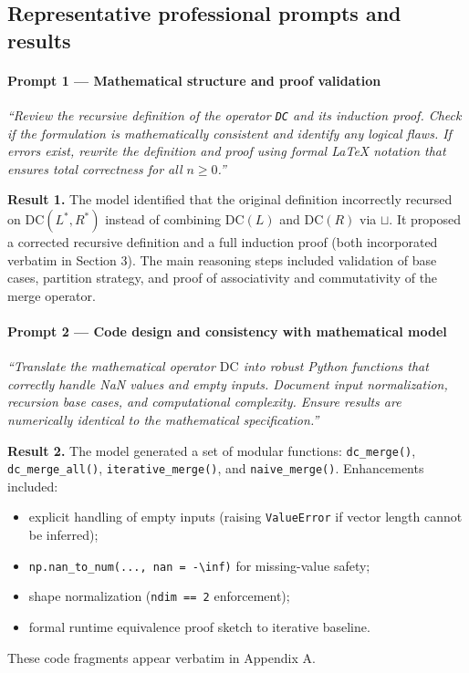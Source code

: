 \documentclass[11pt]{article}
\begin{document}
\subsection*{Representative professional prompts and results}

\paragraph{Prompt 1 — Mathematical structure and proof validation}
\textit{“Review the recursive definition of the operator \texttt{DC} and its induction proof.  
Check if the formulation is mathematically consistent and identify any logical flaws.  
If errors exist, rewrite the definition and proof using formal LaTeX notation that ensures total correctness for all $n\ge0$.”}

\textbf{Result 1.}  
The model identified that the original definition incorrectly recursed on $\mathrm{DC}(L^*,R^*)$ instead of combining $\mathrm{DC}(L)$ and $\mathrm{DC}(R)$ via $\sqcup$.  
It proposed a corrected recursive definition and a full induction proof (both incorporated verbatim in Section 3).  
The main reasoning steps included validation of base cases, partition strategy, and proof of associativity and commutativity of the merge operator.

\paragraph{Prompt 2 — Code design and consistency with mathematical model}
\textit{“Translate the mathematical operator $\mathrm{DC}$ into robust Python functions that correctly handle NaN values and empty inputs.  
Document input normalization, recursion base cases, and computational complexity.  
Ensure results are numerically identical to the mathematical specification.”}

\textbf{Result 2.}  
The model generated a set of modular functions:
\texttt{dc\_merge()}, \texttt{dc\_merge\_all()}, \texttt{iterative\_merge()}, and \texttt{naive\_merge()}.  
Enhancements included:
\begin{itemize}
  \item explicit handling of empty inputs (raising \texttt{ValueError} if vector length cannot be inferred);
  \item \texttt{np.nan\_to\_num(..., nan = -\textbackslash inf)} for missing-value safety;
  \item shape normalization (\texttt{ndim == 2} enforcement);
  \item formal runtime equivalence proof sketch to iterative baseline.
\end{itemize}
These code fragments appear verbatim in Appendix A.
\end{document}
